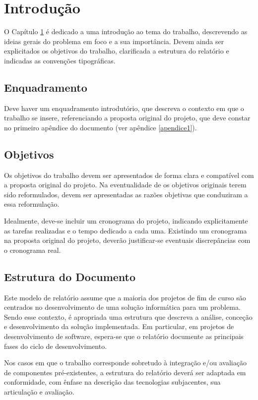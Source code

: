 \chapter{Introdução}\label{cap:intro}

O Capítulo \ref{cap:intro} é dedicado a uma introdução ao tema do trabalho, descrevendo as ideias gerais do problema em foco e a sua importância. Devem ainda ser explicitados os objetivos do trabalho, clarificada a estrutura do relatório e indicadas as convenções tipográficas.

\section{Enquadramento}

Deve haver um enquadramento introdutório, que descreva o contexto em que o trabalho se insere, referenciando a proposta original do projeto, que deve constar no primeiro apêndice do documento (ver apêndice \ref{apendice1}).

\section{Objetivos}

Os objetivos do trabalho devem ser apresentados de forma clara e compatível com a proposta original do projeto. Na eventualidade de os objetivos originais terem sido reformulados, devem ser apresentadas as razões objetivas que conduziram a essa reformulação.

Idealmente, deve-se incluir um cronograma do projeto, indicando explicitamente as tarefas realizadas e o tempo dedicado a cada uma. Existindo um cronograma na proposta original do projeto, deverão justificar-se eventuais discrepâncias com o cronograma real.


\section{Estrutura do Documento}

Este modelo de relatório assume que a maioria dos projetos de fim de curso são centrados no desenvolvimento de uma solução informática para um problema. Sendo esse contexto, é apropriada uma estrutura que descreva a análise, conceção e desenvolvimento da solução implementada. Em particular, em projetos de desenvolvimento de software, espera-se que o relatório documente as principais fases do ciclo de desenvolvimento.

Nos casos em que o trabalho corresponde sobretudo à integração e/ou avaliação de componentes pré-existentes, a estrutura do relatório deverá ser adaptada em conformidade, com ênfase na descrição das tecnologias subjacentes, sua articulação e avaliação.

